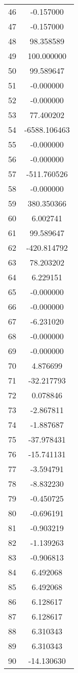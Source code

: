 \documentclass[12pt]{article}
\begin{document}
\begin{longtable}{@{}cc@{}}
46 & -0.157000 \\
47 & -0.157000 \\
48 & 98.358589 \\
49 & 100.000000 \\
50 & 99.589647 \\
51 & -0.000000 \\
52 & -0.000000 \\
53 & 77.400202 \\
54 & -6588.106463 \\
55 & -0.000000 \\
56 & -0.000000 \\
57 & -511.760526 \\
58 & -0.000000 \\
59 & 380.350366 \\
60 & 6.002741 \\
61 & 99.589647 \\
62 & -420.814792 \\
63 & 78.203202 \\
64 & 6.229151 \\
65 & -0.000000 \\
66 & -0.000000 \\
67 & -6.231020 \\
68 & -0.000000 \\
69 & -0.000000 \\
70 & 4.876699 \\
71 & -32.217793 \\
72 & 0.078846 \\
73 & -2.867811 \\
74 & -1.887687 \\
75 & -37.978431 \\
76 & -15.741131 \\
77 & -3.594791 \\
78 & -8.832230 \\
79 & -0.450725 \\
80 & -0.696191 \\
81 & -0.903219 \\
82 & -1.139263 \\
83 & -0.906813 \\
84 & 6.492068 \\
85 & 6.492068 \\
86 & 6.128617 \\
87 & 6.128617 \\
88 & 6.310343 \\
89 & 6.310343 \\
90 & -14.130630 \\

\end{longtable}
\end{document}
